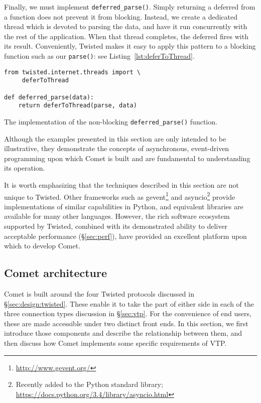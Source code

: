 \documentclass[5p,authoryear]{elsarticle}
\begin{document}
Finally, we must implement \texttt{deferred\_parse()}.  Simply returning a
deferred from a function does not prevent it from blocking.  Instead, we
create a dedicated thread which is devoted to parsing the data, and have it
run concurrently with the rest of the application. When that thread completes,
the deferred fires with its result. Conveniently, Twisted makes it easy to
apply this pattern to a blocking function such as our \texttt{parse()}: see
Listing~\ref{lst:deferToThread}.

\begin{listing}
\begin{verbatim}
from twisted.internet.threads import \
     deferToThread

def deferred_parse(data):
    return deferToThread(parse, data)
\end{verbatim}
\caption{The implementation of the non-blocking \texttt{deferred\_parse()} function.}
\label{lst:deferToThread}
\end{listing}

Although the examples presented in this section are only intended to be
illustrative, they demonstrate the concepts of asynchronous, event-driven
programming upon which Comet is built and are fundamental to understanding its
operation.

It is worth emphasizing that the techniques described in this section are not
unique to Twisted. Other frameworks such as
gevent\footnote{\url{http://www.gevent.org/}} and asyncio\footnote{Recently
added to the Python standard library;
\url{https://docs.python.org/3.4/library/asyncio.html}} provide
implementations of similar capabilities in Python, and equivalent libraries
are available for many other languages. However, the rich software ecosystem
supported by Twisted, combined with its demonstrated ability to deliver
acceptable performance (\S\ref{sec:perf}), have provided an excellent platform
upon which to develop Comet.

\subsection{Comet architecture}
\label{sec:design:architecture}

Comet is built around the four Twisted protocols discussed in
\S\ref{sec:design:twisted}. These enable it to take the part of either side in
each of the three connection types discussion in \S\ref{sec:vtp}. For the
convenience of end users, these are made accessible under two distinct front
ends. In this section, we first introduce those components and describe the
relationship between them, and then discuss how Comet implements some specific
requirements of VTP.
\end{document}
